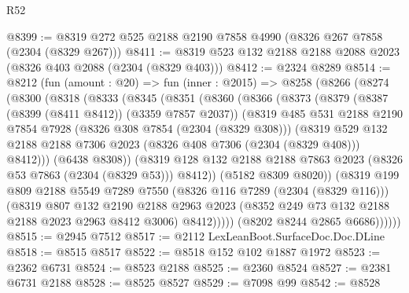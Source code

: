 \begin{lexlean}{R52}
\begin{coremodule}
@8399 := @8319 @272 @525 @2188 @2190 @7858 @4990 (@8326 @267 @7858 (@2304 (@8329 @267)))
@8411 := @8319 @523 @132 @2188 @2188 @2088 @2023 (@8326 @403 @2088 (@2304 (@8329 @403)))
@8412 := @2324 @8289
@8514 := @8212
    (fun (amount : @20) =>
    fun (inner : @2015) =>
    @8258
      (@8266
        (@8274
          (@8300
            (@8318
              (@8333
                (@8345
                  (@8351
                    (@8360
                      (@8366
                        (@8373
                          (@8379
                            (@8387 (@8399 (@8411 @8412)) (@3359 @7857 @2037))
                            (@8319
                              @485
                              @531
                              @2188
                              @2190
                              @7854
                              @7928
                              (@8326 @308 @7854 (@2304 (@8329 @308)))
                              (@8319
                                @529
                                @132
                                @2188
                                @2188
                                @7306
                                @2023
                                (@8326 @408 @7306 (@2304 (@8329 @408)))
                                @8412)))
                          (@6438 @8308))
                        (@8319
                          @128
                          @132
                          @2188
                          @2188
                          @7863
                          @2023
                          (@8326 @53 @7863 (@2304 (@8329 @53)))
                          @8412))
                      (@5182 @8309 @8020))
                    (@8319
                      @199
                      @809
                      @2188
                      @5549
                      @7289
                      @7550
                      (@8326 @116 @7289 (@2304 (@8329 @116)))
                      (@8319
                        @807
                        @132
                        @2190
                        @2188
                        @2963
                        @2023
                        (@8352 @249 @73 @132 @2188 @2188 @2023 @2963 @8412 @3006)
                        @8412)))))
              (@8202 @8244 @2865 @6686))))))
@8515 := @2945 @7512
@8517 := @2112 LexLeanBoot.SurfaceDoc.Doc.DLine
@8518 := @8515 @8517
@8522 := @8518 @152 @102 @1887 @1972
@8523 := @2362 @6731
@8524 := @8523 @2188
@8525 := @2360 @8524
@8527 := @2381 @6731 @2188
@8528 := @8525 @8527
@8529 := @7098 @99
@8542 := @8528

\end{coremodule}
\end{lexlean}
